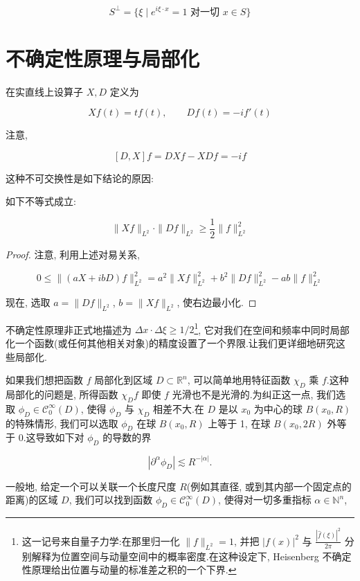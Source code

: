\[
S^\perp = \{\xi \mid e^{i\xi\cdot x} = 1 \text{ 对一切 } x\in S\}
\]


\section{不确定性原理与局部化}

在实直线上设算子 $X, D$ 定义为

\[
Xf(t) = tf(t), \qquad Df(t) = -if'(t)
\]

注意,

\[
[D, X]f = DXf - XDf = -if
\]

这种不可交换性是如下结论的原因:

\begin{proposition}\label{prop:c5-4.1}
如下不等式成立:

\[
\|Xf\|_{L^2}\cdot\|Df\|_{L^2}\geq\frac{1}{2}\|f\|_{L^2}^2
\]
\end{proposition}

\begin{proof}
注意, 利用上述对易关系,

\[
0\leq\|(aX+ibD)f\|_{L^2}^2 = a^2\|Xf\|_{L^2}^2 + b^2\|Df\|_{L^2}^2 - ab\|f\|_{L^2}^2
\]

现在, 选取 $a = \|Df\|_{L^2}$, $b = \|Xf\|_{L^2}$, 使右边最小化.
\end{proof}

不确定性原理非正式地描述为 $\Delta x\cdot\Delta\xi\geq 1/2$\footnote{这一记号来自量子力学:在那里归一化 $\|f\|_{L^2} = 1$, 并把 $|f(x)|^2$ 与 $\frac{|\hat{f}(\xi)|^2}{2\pi}$ 分别解释为位置空间与动量空间中的概率密度.在这种设定下, Heisenberg 不确定性原理给出位置与动量的标准差之积的一个下界.}, 它对我们在空间和频率中同时局部化一个函数(或任何其他相关对象)的精度设置了一个界限.让我们更详细地研究这些局部化.


如果我们想把函数 $f$ 局部化到区域 $D\subset\mathbb{R}^n$, 可以简单地用特征函数 $\chi_D$ 乘 $f$.这种局部化的问题是, 所得函数 $\chi_Df$ 即使 $f$ 光滑也不是光滑的.为纠正这一点, 我们选取 $\phi_D\in\mathcal{C}_0^\infty(D)$, 使得 $\phi_D$ 与 $\chi_D$ 相差不大.在 $D$ 是以 $x_0$ 为中心的球 $B(x_0, R)$ 的特殊情形, 我们可以选取 $\phi_D$ 在球 $B(x_0, R)$ 上等于 1, 在球 $B(x_0, 2R)$ 外等于 0.这导致如下对 $\phi_D$ 的导数的界

\[
|\partial^\alpha\phi_D|\lesssim R^{-|\alpha|}.
\]

一般地, 给定一个可以关联一个长度尺度 $R$(例如其直径, 或到其内部一个固定点的距离)的区域 $D$, 我们可以找到函数 $\phi_D\in\mathcal{C}_0^\infty(D)$, 使得对一切多重指标 $\alpha\in\mathbb{N}^n$,

